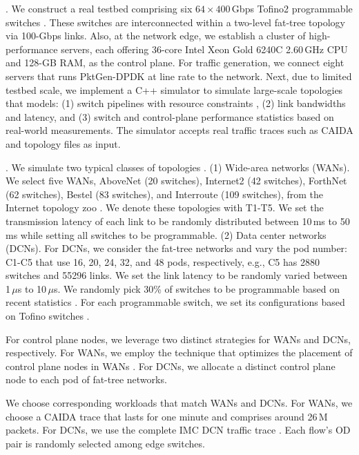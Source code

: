 . We construct a real testbed comprising six \(64 \times 400\)\,Gbps Tofino2 programmable switches \cite{tofino2}. These switches are interconnected within a two-level fat-tree topology via 100-Gbps links. Also, at the network edge, we establish a cluster of high-performance servers, each offering 36-core Intel Xeon Gold 6240C 2.60\,GHz CPU and 128-GB RAM, as the control plane. For traffic generation, we connect eight servers that runs PktGen-DPDK \cite{pktgen} at line rate to the network. Next, due to limited testbed scale, we implement a C++ simulator to simulate large-scale topologies that models: (1) switch pipelines with resource constraints \cite{jose2015compiling}, (2) link bandwidths and latency, and (3) switch and control-plane performance statistics based on real-world measurements. The simulator accepts real traffic traces such as CAIDA \cite{caida} and topology files as input.

. We simulate two typical classes of topologies \cite{anup2022hetero,chen2024eagle}. (1) Wide-area networks (WANs). We select five WANs, AboveNet (20 switches), Internet2 (42 switches), ForthNet (62 switches), Bestel (83 switches), and Interroute (109 switches), from the Internet topology zoo \cite{knight2011internet}. We denote these topologies with T1-T5. We set the transmission latency of each link to be randomly distributed between 10\,ms to 50\,ms while setting all switches to be programmable. (2) Data center networks (DCNs). For DCNs, we consider the fat-tree networks and vary the pod number: C1-C5 that use 16, 20, 24, 32, and 48 pods, respectively, e.g., C5 has 2880 switches and 55296 links. We set the link latency to be randomly varied between 1\,$\mu$s to 10\,$\mu$s. We randomly pick 30\% of switches to be programmable based on recent statistics \cite{telecom}. For each programmable switch, we set its configurations based on Tofino switches \cite{jose2015compiling}.

For control plane nodes, we leverage two distinct strategies for WANs and DCNs, respectively. For WANs, we employ the technique that optimizes the placement of control plane nodes in WANs \cite{heller2012controller}. For DCNs, we allocate a distinct control plane node to each pod of fat-tree networks. 

We choose corresponding workloads that match WANs and DCNs. For WANs, we choose a CAIDA trace \cite{caida} that lasts for one minute and comprises around 26\,M packets. For DCNs, we use the complete IMC DCN traffic trace \cite{benson2010network}. Each flow's OD pair is randomly selected among edge switches. 

